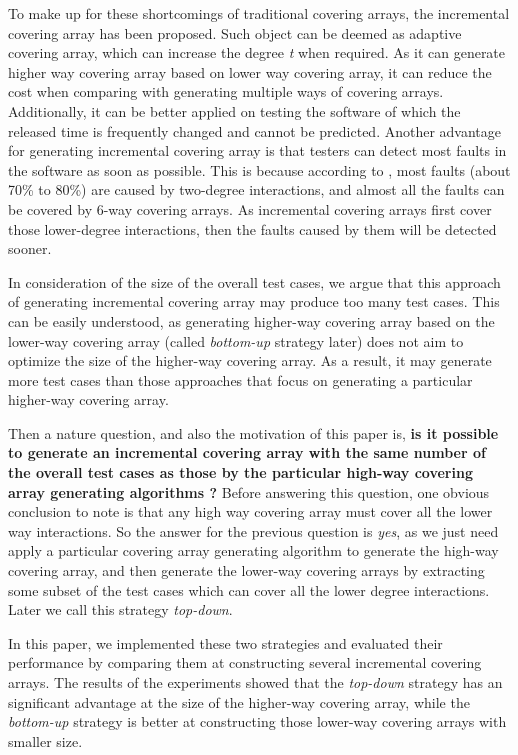 \documentclass[conference]{IEEEtran}
\theoremstyle{definition}
\begin{document}
To make up for these shortcomings of traditional covering arrays, the incremental covering array \cite{fouche2009incremental} has been proposed. Such object can be deemed as adaptive covering array, which can increase the degree \emph{t} when required. As it can generate higher way covering array based on lower way covering array, it can reduce the cost when comparing with generating multiple ways of covering arrays. Additionally, it can be better applied on testing the software of which the released time is  frequently changed and cannot be predicted. Another advantage for generating incremental covering array is that testers can detect most faults in the software as soon as possible. This is because according to \cite{kuhn2002investigation}, most faults (about 70\% to 80\%) are caused by two-degree interactions, and almost all the faults can be covered by 6-way covering arrays. As incremental covering arrays first cover those lower-degree interactions, then the faults caused by them will be detected sooner.


In consideration of the size of the overall test cases, we argue that this approach of generating incremental covering array may produce too many test cases. This can be easily understood, as generating higher-way covering array based on the lower-way covering array (called \emph{bottom-up} strategy later) does not aim to optimize the size of the higher-way covering array. As a result, it may generate more test cases than those approaches that focus on generating a particular higher-way covering array.

Then a nature question, and also the motivation of this paper is, \textbf{is it possible to generate an incremental covering array with the same number of the overall test cases as those by the particular high-way covering array generating algorithms ?}  Before answering this question, one obvious conclusion to note is that any high way covering array must cover all the lower way interactions. So the answer for the previous question is \emph{yes}, as we just need apply a particular covering array generating algorithm to generate the high-way covering array, and then generate the lower-way covering arrays by extracting some subset of the test cases which can cover all the lower degree interactions. Later we call this strategy \emph{top-down}.

In this paper, we implemented these two strategies and evaluated their performance by comparing them at constructing several incremental covering arrays. The results of the experiments showed that the \emph{top-down} strategy has an significant advantage at the size of the higher-way covering array, while the \emph{bottom-up} strategy is better at constructing those lower-way covering arrays with smaller size.
\end{document}
